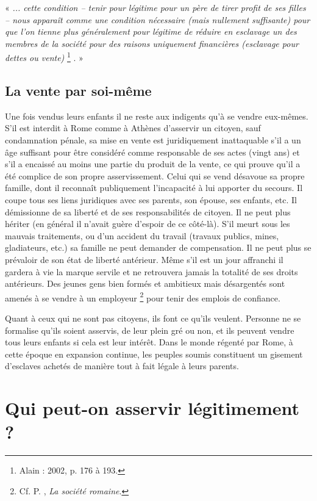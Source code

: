 « \emph{... cette condition -- tenir pour légitime pour un père de tirer profit de ses filles --
nous apparaît comme une condition nécessaire (mais nullement suffisante) pour que
l'on tienne plus généralement pour légitime de réduire en esclavage un des membres de
la société pour des raisons uniquement financières (esclavage pour dettes ou vente)}%
\footnote{Alain  : 2002, p. 176 à 193.}%
. »

\subsection{La vente par soi-même}

Une fois vendus leurs enfants il ne reste aux indigents qu'à se vendre
eux-mêmes. S'il est interdit à Rome comme à Athènes d'asservir un
citoyen, sauf condamnation pénale, sa mise en vente est juridiquement
inattaquable s'il a un âge suffisant pour être considéré comme responsable
de ses actes (vingt ans) et s'il a encaissé au moins une partie du
produit de la vente, ce qui prouve qu'il a été complice de son propre asservissement.
Celui qui se vend désavoue sa propre famille, dont il reconnaît
publiquement l'incapacité à lui apporter du secours. Il coupe
tous ses liens juridiques avec ses parents, son épouse, ses enfants, etc. Il
démissionne de sa liberté et de ses responsabilités de citoyen. Il ne peut
plus hériter (en général il n'avait guère d'espoir de ce côté-là). S'il meurt
sous les mauvais traitements, ou d'un accident du travail (travaux publics,
mines, gladiateurs, etc.) sa famille ne peut demander de compensation. Il
ne peut plus se prévaloir de son état de liberté antérieur. Même s'il est un
jour affranchi il gardera à vie la marque servile et ne retrouvera jamais la totalité
de ses droits antérieurs.
Des jeunes gens bien formés et ambitieux mais désargentés sont
amenés à se vendre à un employeur%
\footnote{Cf. P. , \emph{La société romaine}.}
pour tenir des emplois de confiance.

Quant à ceux qui ne sont pas citoyens, ils font ce qu'ils veulent.
Personne ne se formalise qu'ils soient asservis, de leur plein gré ou non,
et ils peuvent vendre tous leurs enfants si cela est leur intérêt. Dans le
monde régenté par Rome, à cette époque en expansion continue, les
peuples soumis constituent un gisement d'esclaves achetés de manière
tout à fait légale à leurs parents.

\section{Qui peut-on asservir légitimement ?}

